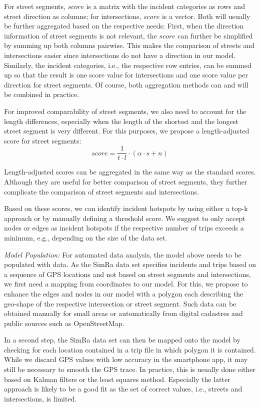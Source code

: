 For street segments, $score$ is a matrix with the incident categories as rows and street direction as columns; for intersections, $score$ is a vector.
Both will usually be further aggregated based on the respective needs:
First, when the direction information of street segments is not relevant, the $score$ can further be simplified by summing up both columns pairwise.
This makes the comparison of streets and intersections easier since intersections do not have a direction in our model.
Similarly, the incident categories, i.e., the respective row entries, can be summed up so that the result is one score value for intersections and one score value per direction for street segments.
Of course, both aggregation methods can and will be combined in practice.

For improved comparability of street segments, we also need to account for the length differences, especially when the length of the shortest and the longest street segment is very different.
For this purposes, we propose a length-adjusted score for street segments:
\begin{equation} \label{eq:score2} score = \frac{1}{t\cdot l} \cdot (\alpha \cdot s + n)\end{equation}

Length-adjusted scores can be aggregated in the same way as the standard scores.
Although they are useful for better comparison of street segments, they further complicate the comparison of street segments and intersections.

Based on these scores, we can identify incident hotspots by using either a top-k approach or by manually defining a threshold score.
We suggest to only accept nodes or edges as incident hotspots if the respective number of trips exceeds a minimum, e.g., depending on the size of the data set.

\textit{Model Population:}
For automated data analysis, the model above needs to be populated with data.
As the SimRa data set specifies incidents and trips based on a sequence of GPS locations and not based on street segments and intersections, we first need a mapping from coordinates to our model.
For this, we propose to enhance the edges and nodes in our model with a polygon each describing the geo-shape of the respective intersection or street segment.
Such data can be obtained manually for small areas or automatically from digital cadastres and public sources such as OpenStreetMap.

In a second step, the SimRa data set can then be mapped onto the model by checking for each location contained in a trip file in which polygon it is contained.
While we discard GPS values with low accuracy in the smartphone app, it may still be necessary to smooth the GPS trace.
In practice, this is usually done either based on Kalman filters or the least squares method.
Especially the latter approach is likely to be a good fit as the set of correct values, i.e., streets and intersections, is limited.

